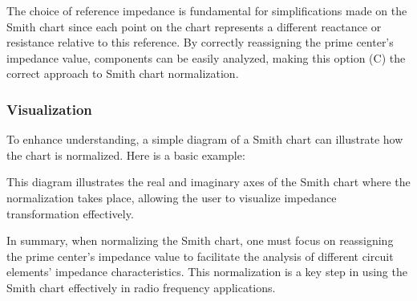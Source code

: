 The choice of reference impedance is fundamental for simplifications made on the Smith chart since each point on the chart represents a different reactance or resistance relative to this reference. By correctly reassigning the prime center's impedance value, components can be easily analyzed, making this option (C) the correct approach to Smith chart normalization.

\subsubsection{Visualization}

To enhance understanding, a simple diagram of a Smith chart can illustrate how the chart is normalized. Here is a basic example:


This diagram illustrates the real and imaginary axes of the Smith chart where the normalization takes place, allowing the user to visualize impedance transformation effectively.

In summary, when normalizing the Smith chart, one must focus on reassigning the prime center's impedance value to facilitate the analysis of different circuit elements' impedance characteristics. This normalization is a key step in using the Smith chart effectively in radio frequency applications.
